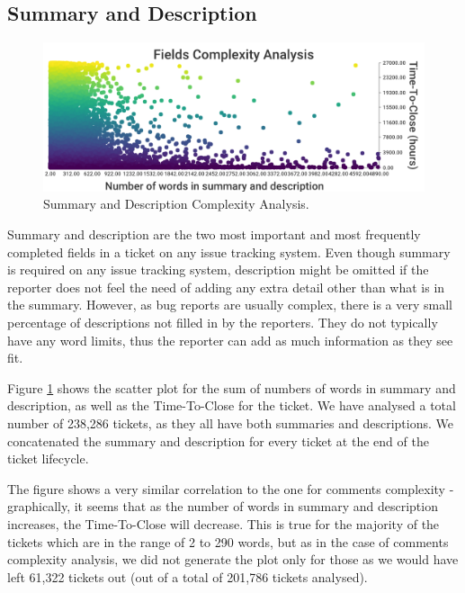 \documentclass{mpaper}
\begin{document}
\subsection{Summary and Description}

\begin{figure}[ht]
  \begin{center}
    \includegraphics[scale=0.25]{images/fields_complexity.png}
  \end{center}
  \caption{\label{fields}Summary and Description Complexity Analysis.}
\end{figure}

Summary and description are the two most important and most frequently completed fields in a ticket on any
issue tracking system. Even though summary is required on any issue tracking system, description might 
be omitted if the reporter does not feel the need of adding any extra detail other than what is in the summary. 
However, as bug reports are usually complex, there is a very small percentage of descriptions not filled in 
by the reporters. They do not typically have any word limits, thus the reporter can add as much information as 
they see fit.

Figure \ref{fields} shows the scatter plot for the sum of numbers of words in summary and description, as well 
as the Time-To-Close for the ticket. We have analysed a total number of 238,286 tickets, as they all have both 
summaries and descriptions. We concatenated the summary and description for every ticket at the end of the ticket 
lifecycle.

The figure shows a very similar correlation to the one for comments complexity - graphically, it seems that as the number of words 
in summary and description increases, the Time-To-Close will decrease. This is true for the majority of the tickets 
which are in the range of 2 to 290 words, but as in the case of comments complexity analysis, we did not generate 
the plot only for those as we would have left 61,322 tickets out (out of a total of 201,786 tickets analysed). 
\end{document}
